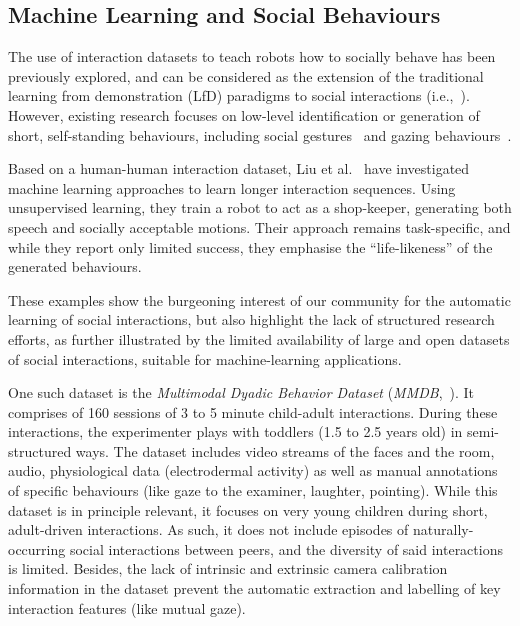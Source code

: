 \documentclass{article}
\newcommand{\etal}{et al.\xspace}
\begin{document}
\subsection*{Machine Learning and Social Behaviours}

The use of interaction datasets to teach robots how to socially behave has been
previously explored, and can be considered as the extension of the traditional
learning from demonstration (LfD) paradigms to social interactions
(i.e.,~\cite{nehaniv2007imitation,mohammad2015interaction}). However, existing
research focuses on low-level identification or generation of short,
self-standing behaviours, including social gestures~\cite{nagai2005learning} and
gazing behaviours~\cite{calinon2006teaching}.

Based on a human-human interaction dataset, Liu \etal~\cite{liu2014how} have
investigated machine learning approaches to learn longer interaction sequences.
Using unsupervised learning, they train a robot to act as a shop-keeper,
generating both speech and socially acceptable motions. Their approach remains
task-specific, and while they report only limited success, they emphasise the
``life-likeness'' of the generated behaviours.

These examples show the burgeoning interest of our community for the automatic
learning of social interactions, but also highlight the lack of structured
research efforts, as further illustrated by the limited availability of large
and open datasets of social interactions, suitable for machine-learning
applications.

One such dataset is the \emph{Multimodal Dyadic Behavior Dataset}
(\emph{MMDB},~\cite{rehg2013decoding}). It comprises of 160 sessions of 3 to 5
minute child-adult interactions. During these interactions, the experimenter
plays with toddlers (1.5 to 2.5 years old) in semi-structured ways.  The dataset
includes video streams of the faces and the room, audio, physiological data
(electrodermal activity) as well as manual annotations of specific behaviours
(like gaze to the examiner, laughter, pointing). While this dataset is in
principle relevant, it focuses on very young children during short, adult-driven
interactions. As such, it does not include episodes of naturally-occurring
social interactions between peers, and the diversity of said interactions is
limited. Besides, the lack of intrinsic and extrinsic camera calibration
information in the dataset prevent the automatic extraction and labelling of key
interaction features (like mutual gaze).
\end{document}

